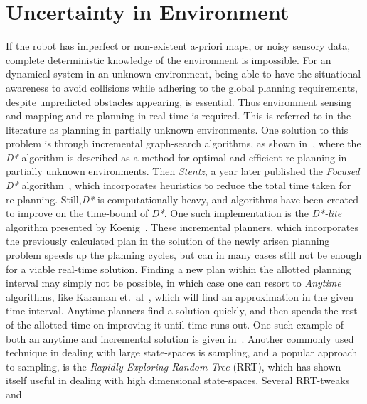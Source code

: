 
\section{Uncertainty in Environment}
If the robot has imperfect or non-existent a-priori maps, or noisy sensory data,
complete deterministic knowledge of the environment is impossible. For an
dynamical system in an unknown environment, being able to have the situational
awareness to avoid collisions while adhering to the global planning
requirements, despite unpredicted obstacles appearing, is essential. Thus
environment sensing and mapping and re-planning in real-time is required. This
is referred to in the literature as planning in partially unknown environments.
One solution to this problem is through incremental graph-search algorithms, as
shown in~\cite{Stentz_1997}, where the \textsl{D*} algorithm is described as a
method for optimal and efficient re-planning in partially unknown environments.
Then \textit{Stentz}, a year later published the \textit{Focused D*}
algorithm~\cite{Stentz:1995:FDA:1643031.1643113}, which incorporates heuristics
to reduce the total time taken for re-planning. Still,\textit{D*} is
computationally heavy, and algorithms have been created to improve on the
time-bound of \textit{D*}. One such implementation is the \textit{D*-lite}
algorithm presented by Koenig~\cite{koenig2002d}. These incremental planners,
which incorporates the previously calculated plan in the solution of the newly
arisen planning problem speeds up the planning cycles, but can in many cases
still not be enough for a viable real-time solution. Finding a new plan within
the allotted planning interval may simply not be possible, in which case one can
resort to \textit{Anytime} algorithms, like Karaman et.\
al~\cite{karamanAnytimeMotionPlanning2011}, which will find an approximation in
the given time interval. Anytime planners find a solution quickly, and then
spends the rest of the allotted time on improving it until time runs out. One
such example of both an anytime and incremental solution is given
in~\cite{likhachevAnytimeSearchDynamic2008}. Another commonly used technique in
dealing with large state-spaces is sampling, and a popular approach to sampling,
is the \textit{Rapidly Exploring Random Tree} (RRT), which has shown itself
useful in dealing with high dimensional state-spaces. Several RRT-tweaks and
